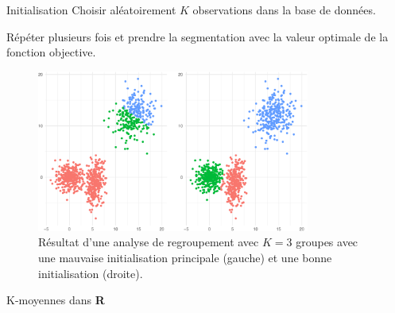 \documentclass[
  ignorenonframetext,
]{beamer}
\newenvironment{Shaded}{\begin{snugshade}}{\end{snugshade}}
\newcommand{\AttributeTok}[1]{\textcolor[rgb]{0.40,0.45,0.13}{#1}}
\newcommand{\CommentTok}[1]{\textcolor[rgb]{0.37,0.37,0.37}{#1}}
\newcommand{\DecValTok}[1]{\textcolor[rgb]{0.68,0.00,0.00}{#1}}
\newcommand{\FunctionTok}[1]{\textcolor[rgb]{0.28,0.35,0.67}{#1}}
\newcommand{\NormalTok}[1]{\textcolor[rgb]{0.00,0.23,0.31}{#1}}
\newcommand{\OtherTok}[1]{\textcolor[rgb]{0.00,0.23,0.31}{#1}}
\newcommand{\SpecialCharTok}[1]{\textcolor[rgb]{0.37,0.37,0.37}{#1}}
\begin{document}
\begin{frame}{Initialisation}
\protect\hypertarget{initialisation}{}
Choisir aléatoirement \(K\) observations dans la base de données.

Répéter plusieurs fois et prendre la segmentation avec la valeur
optimale de la fonction objective.

\begin{figure}

{\centering \includegraphics[width=0.8\textwidth,height=\textheight]{MATH60602-diapos11_files/figure-beamer/fig-kmoyenne-mauvais-1.pdf}

}

\caption{\label{fig-kmoyenne-mauvais}Résultat d'une analyse de
regroupement avec \(K=3\) groupes avec une mauvaise initialisation
principale (gauche) et une bonne initialisation (droite).}

\end{figure}
\end{frame}

\begin{frame}[fragile]{K-moyennes dans \textbf{R}}
\protect\hypertarget{k-moyennes-dans-r}{}
\begin{Shaded}
\end{Shaded}
\end{frame}
\end{document}
